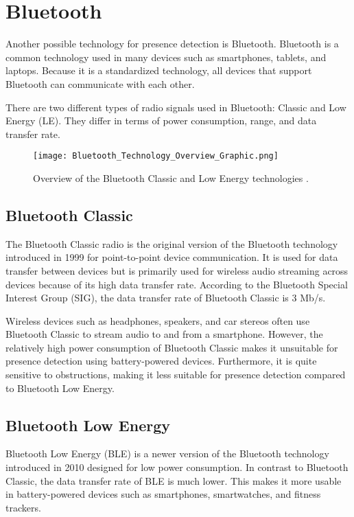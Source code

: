 \section{Bluetooth} \label{sec:bluetooth}

Another possible technology for presence detection is Bluetooth.
Bluetooth is a common technology used in many devices such as smartphones, tablets, and laptops.
Because it is a standardized technology, all devices that support Bluetooth can communicate with each other.

There are two different types of radio signals used in Bluetooth: Classic and Low Energy (LE).
They differ in terms of power consumption, range, and data transfer rate.  \cite{BluetoothSIG}

\begin{figure}[h!]
  \centering
  \texttt{[image: Bluetooth\_Technology\_Overview\_Graphic.png]}
  \caption{Overview of the Bluetooth Classic and Low Energy technologies \cite{BluetoothOverview}.}
  \label{fig:classic_vs_LE}
\end{figure}

\subsection{Bluetooth Classic} \label{sec:bluetooth_classic}
The Bluetooth Classic radio is the original version of the Bluetooth technology introduced in 1999 for point-to-point device communication.
It is used for data transfer between devices but is primarily used for wireless audio streaming across devices because of its high data transfer rate.
According to the Bluetooth Special Interest Group (SIG), the data transfer rate of Bluetooth Classic is 3 Mb/s.

Wireless devices such as headphones, speakers, and car stereos often use Bluetooth Classic to stream audio to and from a smartphone.
However, the relatively high power consumption of Bluetooth Classic makes it unsuitable for presence detection using battery-powered devices.
Furthermore, it is quite sensitive to obstructions, making it less suitable for presence detection compared to Bluetooth Low Energy. \cite{BluetoothSIG}

\subsection{Bluetooth Low Energy} \label{sec:bluetooth_low_energy}
Bluetooth Low Energy (BLE) is a newer version of the Bluetooth technology introduced in 2010 designed for low power consumption.
In contrast to Bluetooth Classic, the data transfer rate of BLE is much lower.
This makes it more usable in battery-powered devices such as smartphones, smartwatches, and fitness trackers.


